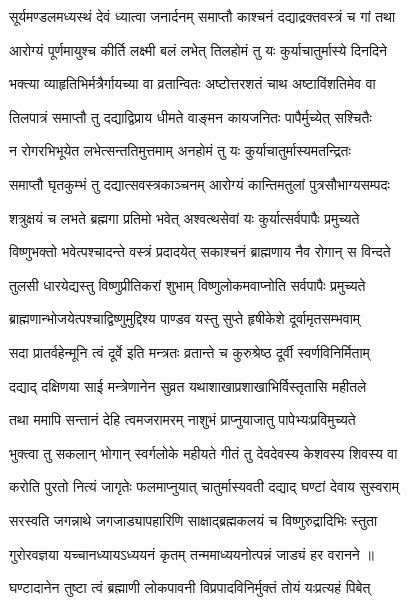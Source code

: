\twolineshloka
{सूर्यमण्डलमध्यस्थं देवं ध्यात्वा जनार्दनम्}
{समाप्तौ काश्चनं दद्याद्रक्तवस्त्रं च गां तथा} %

\twolineshloka
{आरोग्यं पूर्णमायुश्च कीर्ति लक्ष्मी बलं लभेत्}
{तिलहोमं तु यः कुर्याचातुर्मास्ये दिनदिने} %

\twolineshloka
{भक्त्या व्याहृतिभिर्मत्रैर्गायच्या वा व्रतान्वितः}
{अष्टोत्तरशतं चाथ अष्टाविंशतिमेव वा} %

\twolineshloka
{तिलपात्रं समाप्तौ तु दद्याद्विप्राय धीमते}
{वाङ्मन कायजनितः पापैर्मुच्येत् सश्चितैः} %

\twolineshloka
{न रोगरभिभूयेत लभेत्सन्ततिमुत्तमाम्}
{अनहोमं तु यः कुर्याचातुर्मास्यमतन्द्रितः} %

\twolineshloka
{समाप्तौ घृतकुम्भं तु दद्यात्सवस्त्रकाञ्चनम्}
{आरोग्यं कान्तिमतुलां पुत्रसौभाग्यसम्पदः} %

\twolineshloka
{शत्रुक्षयं च लभते ब्रह्मगा प्रतिमो भवेत्}
{अश्वत्थसेवां यः कुर्यात्सर्वपापैः प्रमुच्यते} %

\twolineshloka
{विष्णुभक्तो भवेत्पश्चादन्ते वस्त्रं प्रदादयेत्}
{सकाश्चनं ब्राह्मणाय नैव रोगान् स विन्दते} %

\twolineshloka
{तुलसी धारयेद्यस्तु विष्णुप्रीतिकरां शुभाम्}
{विष्णुलोकमवाप्नोति सर्वपापैः प्रमुच्यते} %

\twolineshloka
{ब्राह्मणान्भोजयेत्पश्चाद्विष्णुमुद्दिश्य पाण्डव}
{यस्तु सुप्ते हृषीकेशे दूर्वामृतसम्भवाम्} %

\twolineshloka
{सदा प्रातर्वहेन्मूनि त्वं दूर्वे इति मन्त्रतः}
{व्रतान्ते च कुरुश्रेष्ठ दूर्वी स्वर्णविनिर्मिताम्} %

\twolineshloka
{दद्याद् दक्षिणया साई मन्त्रेणानेन सुव्रत}
{यथाशाखाप्रशाखाभिर्विस्तृतासि महीतले} %

\twolineshloka
{तथा ममापि सन्तानं देहि त्वमजरामरम्}
{नाशुभं प्राप्नुयाजातु पापेभ्यःप्रविमुच्यते} %

\twolineshloka
{भुक्त्वा तु सकलान् भोगान् स्वर्गलोके महीयते}
{गीतं तु देवदेवस्य केशवस्य शिवस्य वा} %

\twolineshloka
{करोति पुरतो नित्यं जागृतेः फलमाप्नुयात्}
{चातुर्मास्यवती दद्याद् घण्टां देवाय सुस्वराम्} %

\twolineshloka
{सरस्वति जगन्नाथे जगजाड्यापहारिणि}
{साक्षाद्ब्रह्मकलयं च विष्णुरुद्रादिभिः स्तुता} %

\twolineshloka
{गुरोरवज्ञया यच्चानध्यायऽध्ययनं कृतम्}
{तन्ममाध्ययनोत्पन्नं जाड्यं हर वरानने} %
॥

\twolineshloka
{घण्टादानेन तुष्टा त्वं ब्रह्माणी लोकपावनी}
{विप्रपादविनिर्मुक्तं तोयं यःप्रत्यहं पिबेत्} %

